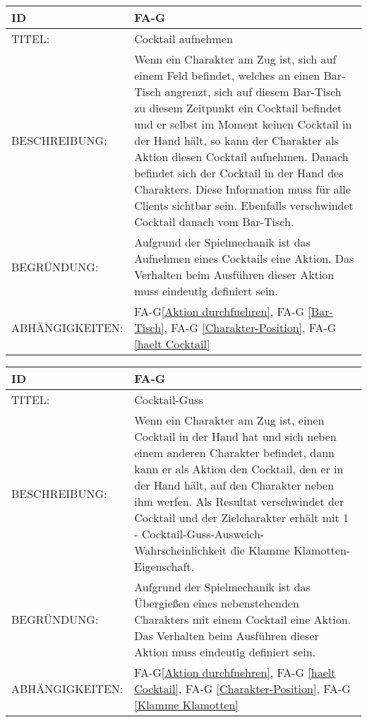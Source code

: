 \begin{tabularx}{16cm}{l|X}
	{table}\label{Cocktail aufnehmen}
	\textbf{ID} & \textbf{FA-G\arabic{table}} \\
	\hline
	TITEL: & Cocktail aufnehmen \\
	\hline
	BESCHREIBUNG: & Wenn ein Charakter am Zug ist, sich auf einem Feld befindet, welches an einen Bar-Tisch angrenzt, sich auf diesem Bar-Tisch zu diesem Zeitpunkt ein Cocktail befindet und er selbst im Moment keinen Cocktail in der Hand hält, so kann der Charakter als Aktion diesen Cocktail aufnehmen. Danach befindet sich der Cocktail in der Hand des Charakters. Diese Information muss für alle Clients sichtbar sein. Ebenfalls verschwindet Cocktail danach vom Bar-Tisch.\\
	 
	\hline
	BEGRÜNDUNG: & Aufgrund der Spielmechanik ist das Aufnehmen eines Cocktails eine Aktion. Das Verhalten beim Ausführen dieser Aktion muss eindeutig definiert sein.\\
	\hline
	ABHÄNGIGKEITEN: & FA-G\ref{Aktion durchfuehren}, FA-G \ref{Bar-Tisch}, FA-G \ref{Charakter-Position},  FA-G \ref{haelt Cocktail} \\
\end{tabularx}

\begin{tabularx}{16cm}{l|X}
	{table}\label{Cocktail-Guss}
	\textbf{ID} & \textbf{FA-G\arabic{table}} \\
	\hline
	TITEL: & Cocktail-Guss \\
	\hline
	BESCHREIBUNG: & Wenn ein Charakter am Zug ist, einen Cocktail in der Hand hat und sich neben einem anderen Charakter befindet, dann kann er als Aktion den Cocktail, den er in der Hand hält, auf den Charakter neben ihm werfen. Als Resultat verschwindet der Cocktail und der Zielcharakter erhält mit 1 - Cocktail-Guss-Ausweich-Wahrscheinlichkeit die Klamme Klamotten-Eigenschaft. \\
	 
	\hline
	BEGRÜNDUNG: & Aufgrund der Spielmechanik ist das Übergießen eines nebenstehenden Charakters mit einem Cocktail eine Aktion. Das Verhalten beim Ausführen dieser Aktion muss eindeutig definiert sein.\\
	\hline
	ABHÄNGIGKEITEN: & FA-G\ref{Aktion durchfuehren}, FA-G \ref{haelt Cocktail}, FA-G \ref{Charakter-Position}, FA-G \ref{Klamme Klamotten}  \\
\end{tabularx}

